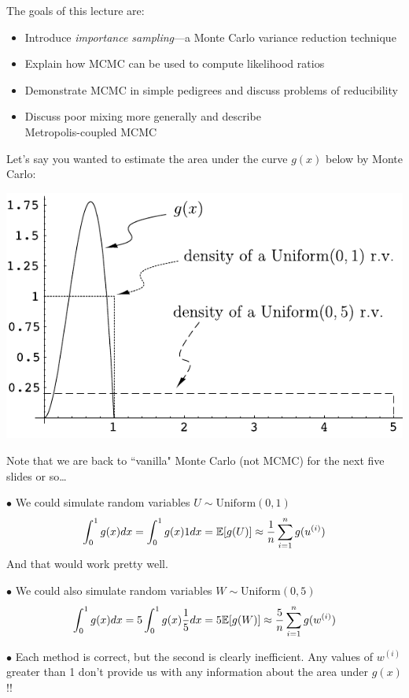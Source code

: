 

\newcommand{\bY}{{\bm{Y}}}
\newcommand{\bX}{{\bm{X}}}
 
 
The goals of this lecture are:
\begin{itemize}
\item Introduce {\em importance sampling}---a Monte Carlo variance reduction technique
\item Explain how MCMC can be used to compute likelihood ratios
\item Demonstrate MCMC in simple pedigrees and discuss problems of reducibility
\item Discuss poor mixing more generally and describe \\ Metropolis-coupled MCMC
\end{itemize}


\vspace*{-.45in}
Let's say you wanted to estimate the area under the curve $g(x)$ below by Monte Carlo:
\begin{center}
\includegraphics[width=.7\textwidth]{illus/betacurve.pdf}
\end{center}
\enlargethispage*{100pt}
Note that we are back to ``vanilla" Monte Carlo (not MCMC) for the next five slides or so\ldots



\newpage
$\bullet$ We could simulate random variables $U\sim\mathrm{Uniform}(0,1)$
\[
\int_0^1g(x)dx = \int_0^1g(x) 1 dx = \Bbb{E}[g(U)] \approx \frac{1}{n}\sum_{i=1}^n g(u^{(i)})
\]
And that would work pretty well.

$\bullet$ We could also simulate random variables $W\sim\mathrm{Uniform}(0,5)$
\[
\int_0^1g(x)dx = 5\int_0^1g(x) \frac{1}{5} dx = 5\Bbb{E}[g(W)] \approx \frac{5}{n}\sum_{i=1}^n g(w^{(i)})
\]

$\bullet$ Each method is correct, but the second is clearly inefficient.  Any values of $w^{(i)}$ greater than 1 don't provide us with any information about the area under $g(x)$!!  

